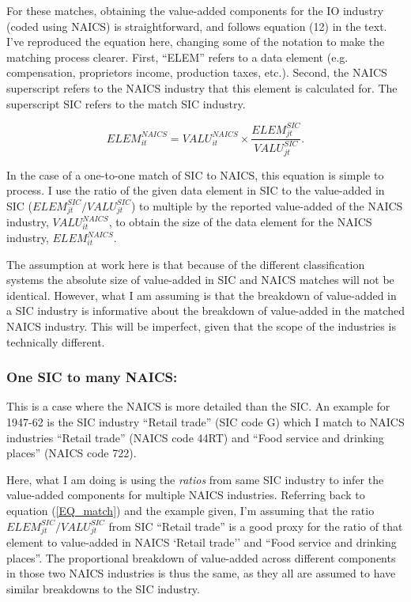 \documentclass[11pt]{article}
\begin{document}
For these matches, obtaining the value-added components for the IO industry (coded using NAICS) is straightforward, and follows equation (12) in the text. I've reproduced the equation here, changing some of the notation to make the matching process clearer. First, ``ELEM'' refers to a data element (e.g. compensation, proprietors income, production taxes, etc.). Second, the NAICS superscript refers to the NAICS industry that this element is calculated for. The superscript SIC refers to the match SIC industry. 

\begin{equation}
	ELEM_{it}^{NAICS} = VALU_{it}^{NAICS} \times \frac{ELEM_{jt}^{SIC}}{VALU_{jt}^{SIC}}. \label{EQ_match}
\end{equation}

In the case of a one-to-one match of SIC to NAICS, this equation is simple to process. I use the ratio of the given data element in SIC to the value-added in SIC ($ELEM_{jt}^{SIC}/VALU_{jt}^{SIC}$) to multiple by the reported value-added of the NAICS industry, $VALU_{it}^{NAICS}$, to obtain the size of the data element for the NAICS industry, $ELEM_{it}^{NAICS}$. 

The assumption at work here is that because of the different classification systems the absolute size of value-added in SIC and NAICS matches will not be identical. However, what I am assuming is that the breakdown of value-added in a SIC industry is informative about the breakdown of value-added in the matched NAICS industry. This will be imperfect, given that the scope of the industries is technically different. 

\subsubsection{One SIC to many NAICS:} This is a case where the NAICS is more detailed than the SIC. An example for 1947-62 is the SIC industry ``Retail trade'' (SIC code G) which I match to NAICS industries ``Retail trade'' (NAICS code 44RT) and ``Food service and drinking places'' (NAICS code 722). 

Here, what I am doing is using the \textit{ratios} from same SIC industry to infer the value-added components for multiple NAICS industries. Referring back to equation (\ref{EQ_match}) and the example given, I'm assuming that the ratio $ELEM_{jt}^{SIC}/VALU_{jt}^{SIC}$ from SIC ``Retail trade'' is a good proxy for the ratio of that element to value-added in NAICS `Retail trade'' and ``Food service and drinking places''. The proportional breakdown of value-added across different components in those two NAICS industries is thus the same, as they all are assumed to have similar breakdowns to the SIC industry. 
\end{document}
